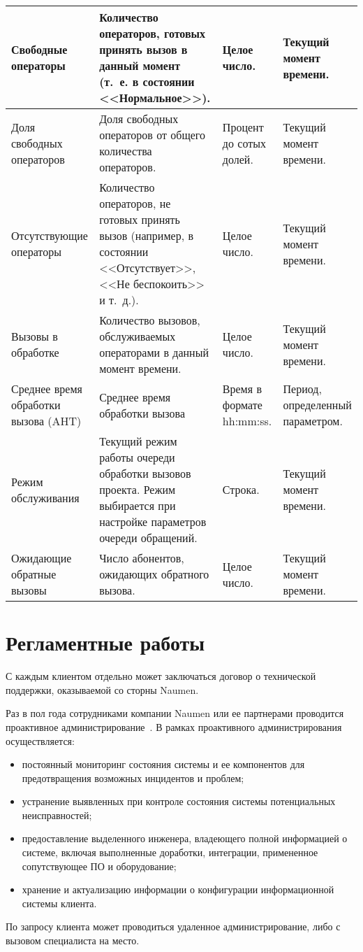 \begin{small}
\begin{longtable}{|p{}|p{}|p{}|p{}|}
        \hline
        Свободные операторы &
        Количество операторов,
        готовых принять вызов в данный момент (т.~е. в состоянии <<Нормальное>>). &
        Целое число. &
        Текущий момент времени. \\
        \hline
        Доля свободных операторов &
        Доля свободных операторов от общего количества операторов. &
        Процент до сотых долей. &
        Текущий момент времени.\\
        \hline
        Отсутствующие операторы &
        Количество операторов, не готовых принять вызов (например, в состоянии <<Отсутствует>>, <<Не беспокоить>> и т.~д.). &
        Целое число. &
        Текущий момент времени.\\
        \hline
        Вызовы в обработке &
        Количество вызовов, обслуживаемых операторами в данный момент времени. &
        Целое число. &
        Текущий момент времени. \\
        \hline
        Среднее время обработки вызова (AHT) &
        Среднее время обработки вызова &
        Время в формате hh:mm:ss. &
        Период, определенный параметром.\\
        \hline
        Режим обслуживания &
        Текущий режим работы очереди обработки вызовов проекта.
        Режим выбирается при настройке параметров очереди обращений. &
        Строка. &
        Текущий момент времени. \\
        \hline
        Ожидающие обратные вызовы &
        Число абонентов, ожидающих обратного вызова. &
        Целое число. &
        Текущий момент времени. \\
    \end{longtable}
\end{small}

\section{Регламентные работы}

С каждым клиентом отдельно может заключаться договор о технической поддержки, оказываемой со сторны Naumen.

Раз в пол года сотрудниками компании Naumen или ее партнерами проводится проактивное администрирование~\cite{naumen:support}.
В рамках проактивного администрирования осуществляется:
\begin{itemize}
    \item постоянный мониторинг состояния системы и ее компонентов для предотвращения возможных
    инцидентов и проблем;
    \item устранение выявленных при контроле состояния системы потенциальных неисправностей;
    \item предоставление выделенного инженера, владеющего полной информацией о системе, включая
    выполненные доработки, интеграции, примененное сопутствующее ПО и оборудование;
    \item хранение и актуализацию информации о конфигурации информационной системы клиента.
\end{itemize}

По запросу клиента может проводиться удаленное администрирование, либо с вызовом специалиста на место.